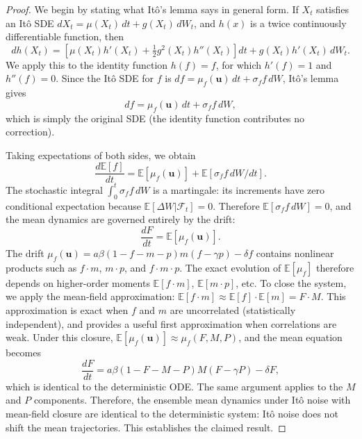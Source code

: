 \documentclass[12pt]{article}
\begin{document}
\begin{proof}
We begin by stating what It\^{o}'s lemma says in general form.  If $X_t$ satisfies an It\^{o} SDE $dX_t = \mu(X_t)\,dt + g(X_t)\,dW_t$, and $h(x)$ is a twice continuously differentiable function, then
\begin{equation}
  dh(X_t) = \left[\mu(X_t)h'(X_t) + \tfrac{1}{2}g^2(X_t)h''(X_t)\right]dt + g(X_t)h'(X_t)\,dW_t.
\end{equation}
We apply this to the identity function $h(f) = f$, for which $h'(f) = 1$ and $h''(f) = 0$.  Since the It\^{o} SDE for $f$ is $df = \mu_f(\mathbf{u})\,dt + \sigma_f f\,dW$, It\^{o}'s lemma gives
\begin{equation}
  df = \mu_f(\mathbf{u})\,dt + \sigma_f f\,dW,
\end{equation}
which is simply the original SDE (the identity function contributes no correction).

Taking expectations of both sides, we obtain
\begin{equation}
  \frac{d\mathbb{E}[f]}{dt} = \mathbb{E}[\mu_f(\mathbf{u})] + \mathbb{E}[\sigma_f f\,dW/dt].
\end{equation}
The stochastic integral $\int_0^t \sigma_f f\,dW$ is a martingale: its increments have zero conditional expectation because $\mathbb{E}[\Delta W | \mathcal{F}_t] = 0$.  Therefore $\mathbb{E}[\sigma_f f\,dW] = 0$, and the mean dynamics are governed entirely by the drift:
\begin{equation}
  \frac{dF}{dt} = \mathbb{E}[\mu_f(\mathbf{u})].
\end{equation}
The drift $\mu_f(\mathbf{u}) = a\beta(1-f-m-p)m(f-\gamma p) - \delta f$ contains nonlinear products such as $f \cdot m$, $m \cdot p$, and $f \cdot m \cdot p$.  The exact evolution of $\mathbb{E}[\mu_f]$ therefore depends on higher-order moments $\mathbb{E}[f \cdot m]$, $\mathbb{E}[m \cdot p]$, etc.  To close the system, we apply the mean-field approximation: $\mathbb{E}[f \cdot m] \approx \mathbb{E}[f] \cdot \mathbb{E}[m] = F \cdot M$.  This approximation is exact when $f$ and $m$ are uncorrelated (statistically independent), and provides a useful first approximation when correlations are weak.  Under this closure, $\mathbb{E}[\mu_f(\mathbf{u})] \approx \mu_f(F,M,P)$, and the mean equation becomes
\begin{equation}
  \frac{dF}{dt} = a\beta(1-F-M-P)M(F - \gamma P) - \delta F,
\end{equation}
which is identical to the deterministic ODE.  The same argument applies to the $M$ and $P$ components.  Therefore, the ensemble mean dynamics under It\^{o} noise with mean-field closure are identical to the deterministic system: It\^{o} noise does not shift the mean trajectories.  This establishes the claimed result.
\end{proof}
\end{document}
